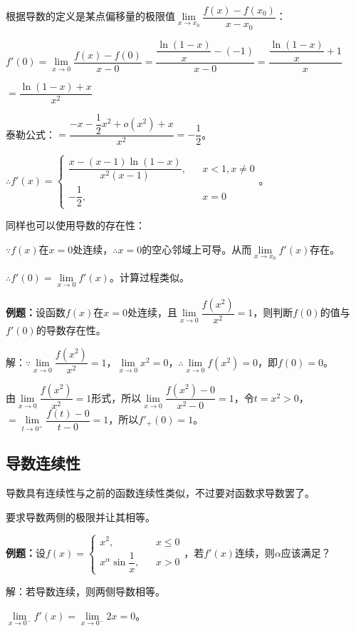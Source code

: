 根据导数的定义是某点偏移量的极限值$\lim\limits_{x\to x_0}\dfrac{f(x)-f(x_0)}{x-x_0}$：

$f'(0)=\lim\limits_{x\to 0}\dfrac{f(x)-f(0)}{x-0}=\dfrac{\dfrac{\ln(1-x)}{x}-(-1)}{x-0}=\dfrac{\dfrac{\ln(1-x)}{x}+1}{x}$\medskip

$=\dfrac{\ln(1-x)+x}{x^2}$

泰勒公式：$=\dfrac{-x-\dfrac{1}{2}x^2+o(x^2)+x}{x^2}=-\dfrac{1}{2}$。\medskip

$\therefore f'(x)=\left\{\begin{array}{lcl}
    \dfrac{x-(x-1)\ln(1-x)}{x^2(x-1)}, & & x<1,x\neq 0 \\
    -\dfrac{1}{2}, & & x=0
\end{array}
\right.$。\medskip

同样也可以使用导数的存在性：

$\because f(x)$在$x=0$处连续，$\therefore x=0$的空心邻域上可导。从而$\lim\limits_{x\to x_0}f'(x)$存在。

$\therefore f'(0)=\lim\limits_{x\to 0}f'(x)$。计算过程类似。

\textbf{例题：}设函数$f(x)$在$x=0$处连续，且$\lim\limits_{x\to0}\dfrac{f(x^2)}{x^2}=1$，则判断$f(0)$的值与$f'(0)$的导数存在性。

解：$\because\lim\limits_{x\to0}\dfrac{f(x^2)}{x^2}=1$，$\lim\limits_{x\to0}x^2=0$，$\therefore\lim\limits_{x\to0}f(x^2)=0$，即$f(0)=0$。

由$\lim\limits_{x\to0}\dfrac{f(x^2)}{x^2}=1$形式，所以$\lim\limits_{x\to0}\dfrac{f(x^2)-0}{x^2-0}=1$，令$t=x^2>0$，$=\lim\limits_{t\to0^+}\dfrac{f(t)-0}{t-0}=1$，所以$f'_+(0)=1$。

\subsection{导数连续性}

导数具有连续性与之前的函数连续性类似，不过要对函数求导数罢了。

要求导数两侧的极限并让其相等。\medskip

\textbf{例题：}设$f(x)=\left\{\begin{array}{lcl}
    x^2, & & x\leqslant 0 \\
    x^\alpha\sin\dfrac{1}{x}, & & x>0
\end{array}
\right.$，若$f'(x)$连续，则$\alpha$应该满足？ 

解：若导数连续，则两侧导数相等。

$\lim\limits_{x\to 0^-}f'(x)=\lim\limits_{x\to 0^-}2x=0$。

